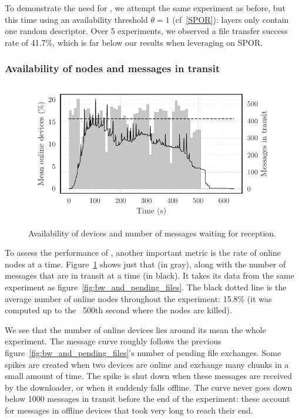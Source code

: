 To demonstrate the need for , 
we attempt the same experiment as before, but this time using an availability threshold $\theta = 1$ (cf~\ref{SPOR}): 
layers only contain one random descriptor.
Over 5 experiments, we observed a file transfer success rate of 41.7\%, which is far below our results when leveraging on \ac{SPOR}.


\subsubsection{Availability of nodes and messages in transit} %
\label{ssub:traffic_and_availability}


\begin{figure}[t]
  \centering
  \includegraphics[width=0.9\columnwidth]{figures/avail.pdf}

  \caption{\label{fig:avail}
  Availability of devices and number of messages waiting for reception.}
\end{figure}

To assess the performance of \name, another important metric is the rate of online nodes at a time.
Figure~\ref{fig:avail} shows just that (in gray), along with the number of messages that are in transit at a time (in black). 
It takes its data from the same experiment as figure~\ref{fig:bw_and_pending_files}.
The black dotted line is the average number of online nodes throughout the experiment: 15.8\% (it was computed up to the ~500th second where the nodes are killed).

We see that the number of online devices lies around its mean the whole experiment.
The message curve roughly follows the previous figure~\ref{fig:bw_and_pending_files}'s number of pending file exchanges. 
Some spikes are created when two devices are online and exchange many chunks in a small amount of time. 
The spike is shut down when these messages are received by the downloader, or when it suddenly falls offline.
The curve never goes down below 1000 messages in transit before the end of the experiment: these account for messages in offline devices that took very long to reach their end.

